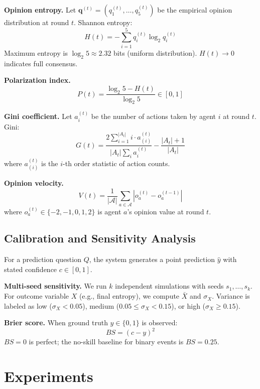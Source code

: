 \documentclass[10pt,twocolumn]{article}
\begin{document}
\textbf{Opinion entropy.} Let $\mathbf{q}^{(t)} = (q_1^{(t)}, \ldots, q_5^{(t)})$ be the empirical opinion distribution at round $t$. Shannon entropy:
\begin{equation}
  H(t) = -\sum_{i=1}^5 q_i^{(t)} \log_2 q_i^{(t)}
\end{equation}
Maximum entropy is $\log_2 5 \approx 2.32$ bits (uniform distribution). $H(t) \to 0$ indicates full consensus.

\textbf{Polarization index.}
\begin{equation}
  P(t) = \frac{\log_2 5 - H(t)}{\log_2 5} \in [0, 1]
\end{equation}

\textbf{Gini coefficient.} Let $a_i^{(t)}$ be the number of actions taken by agent $i$ at round $t$. Gini:
\begin{equation}
  G(t) = \frac{2 \sum_{i=1}^{|A_t|} i \cdot a_{(i)}^{(t)}}{|A_t| \sum_i a_i^{(t)}} - \frac{|A_t|+1}{|A_t|}
\end{equation}
where $a_{(i)}^{(t)}$ is the $i$-th order statistic of action counts.

\textbf{Opinion velocity.}
\begin{equation}
  V(t) = \frac{1}{|\mathcal{A}|} \sum_{a \in \mathcal{A}} |o_a^{(t)} - o_a^{(t-1)}|
\end{equation}
where $o_a^{(t)} \in \{-2, -1, 0, 1, 2\}$ is agent $a$'s opinion value at round $t$.

\subsection{Calibration and Sensitivity Analysis}

For a prediction question $Q$, the system generates a point prediction $\hat{y}$ with stated confidence $c \in [0,1]$.

\textbf{Multi-seed sensitivity.} We run $k$ independent simulations with seeds $s_1, \ldots, s_k$. For outcome variable $X$ (e.g., final entropy), we compute $\bar{X}$ and $\sigma_X$. Variance is labeled as low ($\sigma_X < 0.05$), medium ($0.05 \leq \sigma_X < 0.15$), or high ($\sigma_X \geq 0.15$).

\textbf{Brier score.} When ground truth $y \in \{0,1\}$ is observed:
\begin{equation}
  BS = (c - y)^2
\end{equation}
$BS = 0$ is perfect; the no-skill baseline for binary events is $BS = 0.25$.

\section{Experiments}
\end{document}
